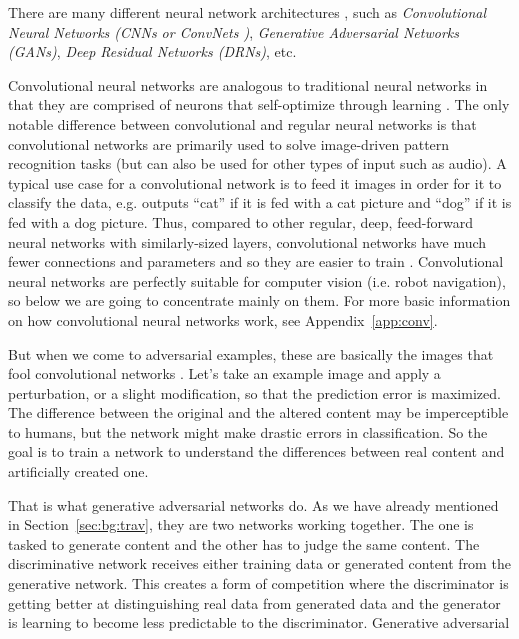 \documentclass[12pt,a4paper]{report}
\newcommand{\alleg}{\enquote}
\newcommand{\term}{\textit}
\newcommand{\acronym}{\MakeUppercase}
\begin{document}
	There are many different neural network architectures \citep{Veen}, such as 
	\term{Convolutional Neural Networks (\acronym{cnn}s or ConvNets \citep{Simonyan_vgg})}, 
	\term{Generative Adversarial Networks (\acronym{gan}s)}, \term{Deep Residual Networks 
	(\acronym{drn}s)}, etc.
	\par
	Convolutional neural networks are analogous to traditional neural networks in 
	that they are comprised of neurons that self-optimize through learning \citep{Shea}. 
	The only notable difference between convolutional and regular neural networks is 
	that convolutional networks are primarily used to solve image-driven pattern 
	recognition tasks (but can also be used for other types of input such as audio). 
	A typical use case for a convolutional network is to feed it images in order for 
	it to classify the data, e.g. outputs \alleg{cat} if it is fed with a cat picture 
	and \alleg{dog} if it is fed with a dog picture. Thus, compared to other regular, 
	deep, feed-forward neural networks with similarly-sized layers, convolutional 
	networks have much fewer connections and parameters and so they are easier to train 
	\citep{Krizhevsky_alexnet}. Convolutional neural networks are perfectly suitable for 
	computer vision (i.e. robot navigation), so below we are going to concentrate 
	mainly on them. For more basic information on how convolutional neural networks work, 
	see Appendix~\ref{app:conv}.
	\par
	But when we come to adversarial examples, these are basically the images that fool 
	convolutional networks \citep{Deshpande}. Let’s take an example image and apply 
	a perturbation, or a slight modification, so that the prediction error is maximized. 
	The difference between the original and the altered content may be imperceptible 
	to humans, but the network might make drastic errors in classification. So the 
	goal is to train a network to understand the differences between real content and 
	artificially created one. 
	\par
	That is what generative adversarial networks 
	\citep{Goodfellow} do. As we have already mentioned in Section~\ref{sec:bg:trav}, 
	they are two networks working together. The one is tasked 
	to generate content and the other has to judge the same content. The discriminative 
	network receives either training data or generated content from the generative 
	network. This creates a form of competition where the discriminator is getting 
	better at distinguishing real data from generated data and the generator is 
	learning to become less predictable to the discriminator. Generative adversarial 
\end{document}
